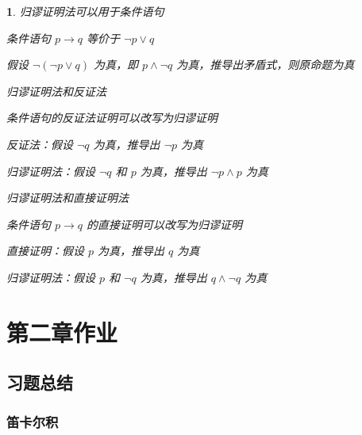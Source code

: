 \documentclass[UTF8]{report}
\theoremstyle{MyLineTheoremStyle} %
\theoremstyle{MyBlockTheoremStyle} %
\theoremstyle{MySubsubsectionStyle} %
\newtheorem{definition}{}
\begin{document}
\begin{definition}
    归谬证明法可以用于条件语句\par
    条件语句 $p \rightarrow q$ 等价于 $\neg p \lor q$\par
    假设 $\neg (\neg p \lor q)$ 为真，即 $p \land \neg q$ 为真，推导出矛盾式，则原命题为真\par
\vspace{1em}
    归谬证明法和反证法\par
    条件语句的反证法证明可以改写为归谬证明\par
    反证法：假设 $\neg q$ 为真，推导出 $\neg p$ 为真\par
    归谬证明法：假设 $\neg q$ 和 $p$ 为真，推导出 $\neg p \land p$ 为真\par
\vspace{1em}
    归谬证明法和直接证明法\par
    条件语句 $p \rightarrow q$ 的直接证明可以改写为归谬证明\par
    直接证明：假设 $p$ 为真，推导出 $q$ 为真\par
    归谬证明法：假设 $p$ 和 $\neg q$ 为真，推导出 $q \land \neg q$ 为真\par
\end{definition}



\chapter{第二章作业}\thispagestyle{fancy}

\section{习题总结}

\subsection{笛卡尔积}
\end{document}
